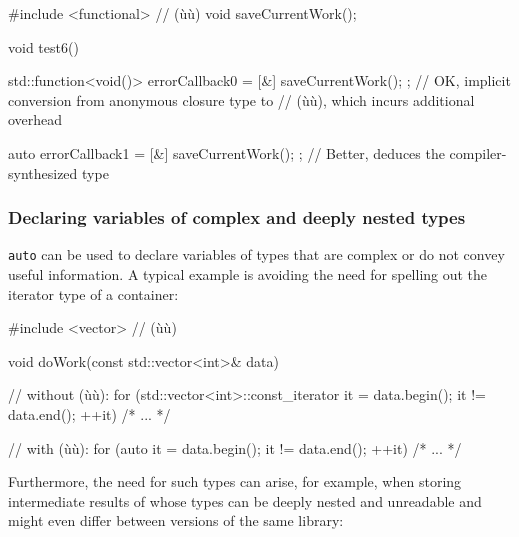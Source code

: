 \begin{emcppshiddenlisting}[emcppsbatch=e8]
#include <functional>      // (ù{}ù)
void saveCurrentWork();
\end{emcppshiddenlisting}
\begin{emcppslisting}[emcppsbatch=e8]
void test6()
{
    std::function<void()> errorCallback0 = [&]{ saveCurrentWork(); };
        // OK, implicit conversion from anonymous closure type to
        // (ù{}ù), which incurs additional overhead

    auto errorCallback1 = [&]{ saveCurrentWork(); };
        // Better, deduces the compiler-synthesized type
}
\end{emcppslisting}
    

\subsubsection[Declaring variables of complex and deeply nested types]{Declaring variables of complex and deeply nested types}\label{declaring-variables-of-complex-and-deeply-nested-types}

\lstinline!auto! can be used to declare variables of types that are complex
or do not convey useful information. A typical example is avoiding the
need for spelling out the iterator type of a container:

\begin{emcppshiddenlisting}[emcppsbatch=e9]
#include <vector>      // (ù{}ù)
\end{emcppshiddenlisting}
\begin{emcppslisting}[emcppsbatch=e9]
void doWork(const std::vector<int>& data)
{
    // without (ù{}ù):
    for (std::vector<int>::const_iterator it = data.begin();
         it != data.end();
         ++it) {
        /* ... */
    }

    // with (ù{}ù):
    for (auto it = data.begin(); it != data.end(); ++it) { /* ... */ }
}
\end{emcppslisting}
    
\noindent Furthermore, the need for such types can arise, for example, when
storing intermediate results of  whose types can
be deeply nested and unreadable and might even differ between versions of
the same library:

